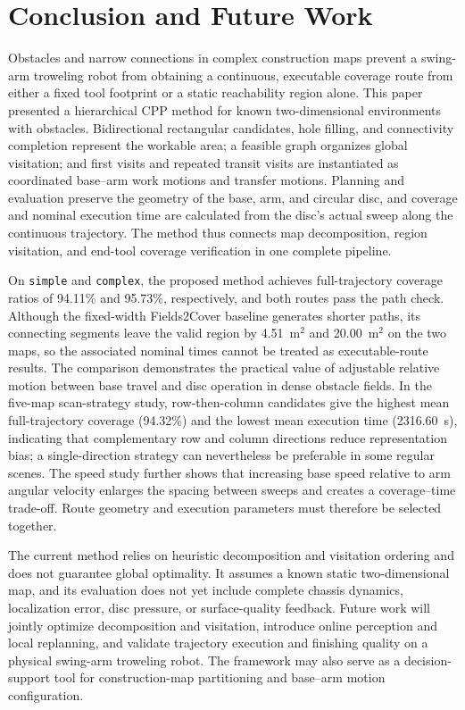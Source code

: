 \section{Conclusion and Future Work}
\label{sec:conclusion}

Obstacles and narrow connections in complex construction maps prevent a swing-arm troweling robot from obtaining a continuous, executable coverage route from either a fixed tool footprint or a static reachability region alone. This paper presented a hierarchical CPP method for known two-dimensional environments with obstacles. Bidirectional rectangular candidates, hole filling, and connectivity completion represent the workable area; a feasible graph organizes global visitation; and first visits and repeated transit visits are instantiated as coordinated base--arm work motions and transfer motions. Planning and evaluation preserve the geometry of the base, arm, and circular disc, and coverage and nominal execution time are calculated from the disc's actual sweep along the continuous trajectory. The method thus connects map decomposition, region visitation, and end-tool coverage verification in one complete pipeline.

On \texttt{simple} and \texttt{complex}, the proposed method achieves full-trajectory coverage ratios of 94.11\% and 95.73\%, respectively, and both routes pass the path check. Although the fixed-width Fields2Cover baseline generates shorter paths, its connecting segments leave the valid region by 4.51~m$^2$ and 20.00~m$^2$ on the two maps, so the associated nominal times cannot be treated as executable-route results. The comparison demonstrates the practical value of adjustable relative motion between base travel and disc operation in dense obstacle fields. In the five-map scan-strategy study, row-then-column candidates give the highest mean full-trajectory coverage (94.32\%) and the lowest mean execution time (2316.60~s), indicating that complementary row and column directions reduce representation bias; a single-direction strategy can nevertheless be preferable in some regular scenes. The speed study further shows that increasing base speed relative to arm angular velocity enlarges the spacing between sweeps and creates a coverage--time trade-off. Route geometry and execution parameters must therefore be selected together.

The current method relies on heuristic decomposition and visitation ordering and does not guarantee global optimality. It assumes a known static two-dimensional map, and its evaluation does not yet include complete chassis dynamics, localization error, disc pressure, or surface-quality feedback. Future work will jointly optimize decomposition and visitation, introduce online perception and local replanning, and validate trajectory execution and finishing quality on a physical swing-arm troweling robot. The framework may also serve as a decision-support tool for construction-map partitioning and base--arm motion configuration.
